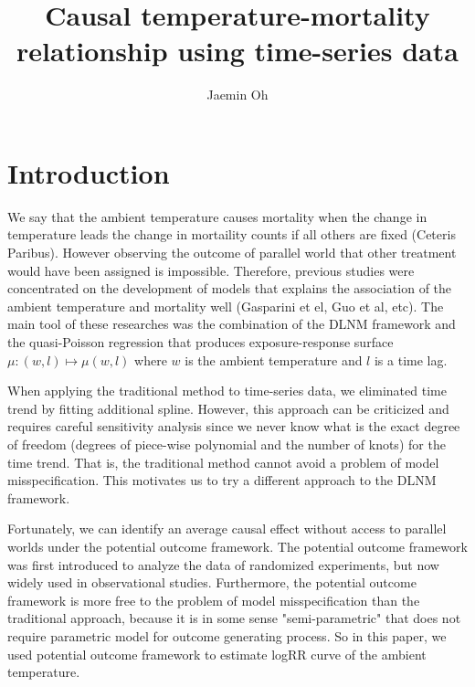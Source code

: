 \documentclass[12pt]{article}
\author[1]{Jaemin Oh}
\affil[1]{Department of Mathematical Sciences, KAIST}
\title{Causal temperature-mortality relationship using time-series data}
\begin{document}
\maketitle


\section{Introduction}

We say that the ambient temperature causes mortality
when the change in temperature leads the change in mortaility counts
if all others are fixed (Ceteris Paribus).
However observing the outcome of parallel world 
that other treatment would have been assigned is impossible.
Therefore, previous studies were concentrated on the development of models
that explains the association of the ambient temperature and mortality well 
(Gasparini et el, Guo et al, etc).
The main tool of these researches was the combination of the DLNM framework\cite{dlnm2010,dlnm2010R}
and the quasi-Poisson regression\cite{quasipoisson} that produces exposure-response surface
$\mu : (w, l) \mapsto \mu(w,l)$ where $w$ is the ambient temperature and $l$ is a time lag.

When applying the traditional method to time-series data, 
we eliminated time trend by fitting additional spline. 
However, this approach can be criticized and requires careful sensitivity analysis
since we never know what is the exact degree of freedom 
(degrees of piece-wise polynomial and the number of knots) for the time trend. 
That is, the traditional method cannot avoid a problem of model misspecification.
This motivates us to try a different approach to the DLNM framework.

Fortunately, we can identify an average causal effect without access to parallel worlds
under the potential outcome framework.
The potential outcome framework was first introduced 
to analyze the data of randomized experiments\cite{rubin1974},
but now widely used in observational studies\cite{wu2020sciadv}.
Furthermore, the potential outcome framework is more free 
to the problem of model misspecification than the traditional approach, 
because it is in some sense "semi-parametric" 
that does not require parametric model for outcome generating process.\cite{angrist2018} 
So in this paper, we used potential outcome framework 
to estimate logRR curve of the ambient temperature.
\end{document}
